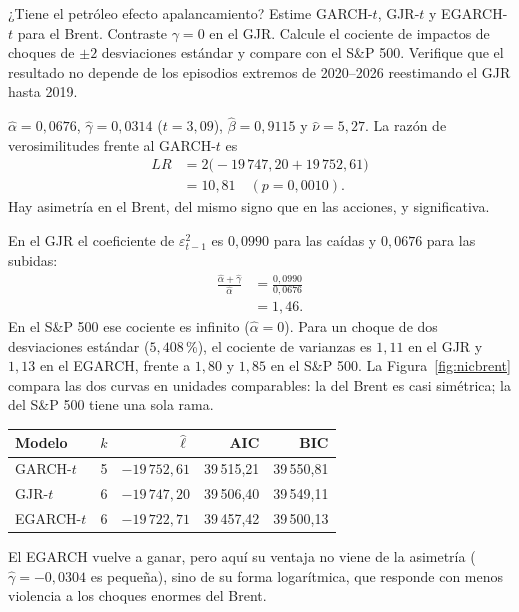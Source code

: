 \begin{ejresuelto}{¿Tiene el petróleo efecto apalancamiento?}\label{ej:asimbrent}
\enunciado Estime GARCH-$t$, GJR-$t$ y EGARCH-$t$ para el Brent. Contraste $\gamma=0$ en el GJR. Calcule el
cociente de impactos de choques de $\pm2$ desviaciones estándar y compare con el S\&P 500. Verifique que el
resultado no depende de los episodios extremos de 2020--2026 reestimando el GJR hasta 2019.

\solucion
{} $\hat\alpha=0{,}0676$, $\hat\gamma=0{,}0314$ ($t=3{,}09$), $\hat\beta=0{,}9115$ y
$\hat\nu=5{,}27$. La razón de verosimilitudes frente al GARCH-$t$ es
\begin{align*}
  LR &= 2\bigl(-19\,747{,}20+19\,752{,}61\bigr)\\
     &= 10{,}81\quad(p=0{,}0010).
\end{align*}
Hay asimetría en el Brent, del mismo signo que en las acciones, y significativa.

 En el GJR el coeficiente de $\varepsilon_{t-1}^2$ es $0{,}0990$ para las caídas y
$0{,}0676$ para las subidas:
\begin{align*}
  \frac{\hat\alpha+\hat\gamma}{\hat\alpha} &= \frac{0{,}0990}{0{,}0676}\\
                                         &= 1{,}46 .
\end{align*}
En el S\&P 500 ese cociente es infinito ($\hat\alpha=0$). Para un choque de dos desviaciones estándar ($5{,}408$\,\%),
el cociente de varianzas es $1{,}11$ en el GJR y $1{,}13$ en el EGARCH, frente a $1{,}80$ y $1{,}85$ en el
S\&P 500. La Figura~\ref{fig:nicbrent} compara las dos curvas en unidades comparables: la del Brent es casi
simétrica; la del S\&P 500 tiene una sola rama.

\begin{center}\small
\begin{tabular}{@{}lrrrr@{}}
\toprule
Modelo & $k$ & $\hat\ell$ & AIC & BIC \\
\midrule
GARCH-$t$  & 5 & $-19\,752{,}61$ & 39\,515,21 & 39\,550,81 \\
GJR-$t$    & 6 & $-19\,747{,}20$ & 39\,506,40 & 39\,549,11 \\
EGARCH-$t$ & 6 & $-19\,722{,}71$ & 39\,457,42 & 39\,500,13 \\
\bottomrule
\end{tabular}
\end{center}
El EGARCH vuelve a ganar, pero aquí su ventaja no viene de la asimetría ($\hat\gamma=-0{,}0304$ es pequeña),
sino de su forma logarítmica, que responde con menos violencia a los choques enormes del Brent.


\end{ejresuelto}

